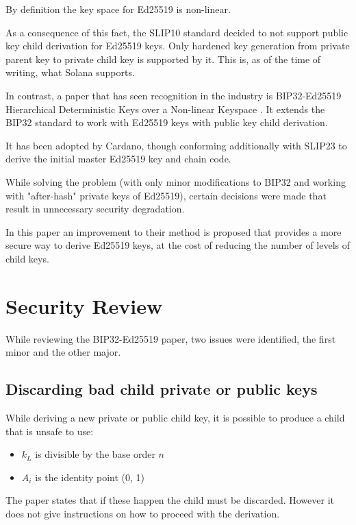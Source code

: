 \documentclass[12pt, a4paper, twocolumn]{article}
\begin{document}
By definition the key space for Ed25519 is non-linear.

As a consequence of this fact, the SLIP10\cite{SLIP10} standard decided to not support public key child derivation for Ed25519 keys. Only hardened key generation from private parent key to private child key is supported by it. This is, as of the time of writing, what Solana supports\cite{SolanaBip32}. 

In contrast, a paper that has seen recognition in the industry is BIP32-Ed25519
Hierarchical Deterministic Keys over a Non-linear Keyspace \cite{BIP32-Ed25519}. It extends the BIP32 standard to work with Ed25519 keys with public key child derivation.

It has been adopted by Cardano, though conforming additionally with SLIP23\cite{SLIP23} to derive the initial master Ed25519 key and chain code.

While solving the problem (with only minor modifications to BIP32 and working with "after-hash" private keys of Ed25519)\cite{BIP32-Ed25519}, certain decisions were made that result in unnecessary security degradation.

In this paper an improvement to their method is proposed that provides a more secure way to derive Ed25519 keys, at the cost of reducing the number of levels of child keys.


\section{Security Review}

While reviewing the BIP32-Ed25519 paper\cite{BIP32-Ed25519}, two issues were identified, the first minor and the other major.

\subsection{Discarding bad child private or public keys}

While deriving a new private or public child key, it is possible to produce a child that is unsafe to use:

\begin{itemize}[label=\textendash, itemsep=-0.5em]
  \item $k_L$ is divisible by the base order $n$
  \item $A_i$ is the identity point (0, 1)
\end{itemize}

The paper states that if these happen the child must be discarded. However it does not give instructions on how to proceed with the derivation.
\end{document}
